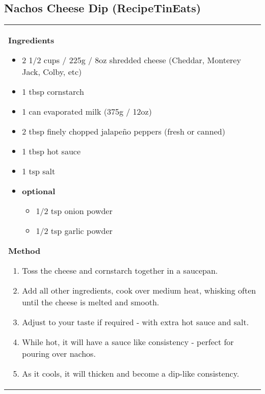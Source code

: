 \documentclass[web-recipes.tex]{subfiles}
\begin{document}
\renewcommand{\mytitle}{Nachos Cheese Dip (RecipeTinEats)}
\renewcommand{\myurl}{https://www.recipetineats.com/nachos-cheese-dip-sauce/}
\begin{mdframed}[nobreak]
  \section{\mytitle}
  \begin{tabular}{l}
    \begin{minipage}[t]{0.35\textwidth}
      {\sffamily\bfseries Ingredients}\vspace{0.5ex}
          \begin{itemize}
            \item 2 1/2 cups / 225g / 8oz shredded cheese (Cheddar, Monterey Jack, Colby, etc)
            \item 1 tbsp cornstarch
            \item 1 can evaporated milk (375g / 12oz)
            \item 2 tbsp finely chopped jalapeño peppers (fresh or canned)
            \item 1 tbsp hot sauce
            \item 1 tsp salt
            \item \textbf{optional}
              \begin{itemize}
                \item 1/2 tsp onion powder
                \item 1/2 tsp garlic powder
              \end{itemize}
          \end{itemize}
    \end{minipage}
    \qquad
    \begin{minipage}[t]{0.55\textwidth}
      {\sffamily\bfseries Method}\vspace{0.5ex}
      \begin{enumerate}\raggedright\small\sffamily
        \item Toss the cheese and cornstarch together in a saucepan.
        \item Add all other ingredients, cook over medium heat, whisking often
          until the cheese is melted and smooth.
        \item Adjust to your taste if required - with extra hot sauce and salt.
        \item While hot, it will have a sauce like consistency - perfect for
          pouring over nachos.
        \item As it cools, it will thicken and become a dip-like consistency.

\end{enumerate}
\end{minipage}
\end{tabular}
\end{mdframed}
\end{document}
